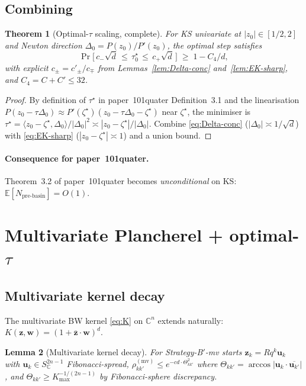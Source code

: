 \documentclass[11pt,a4paper]{article}
\newtheorem{theorem}{Theorem}[section]
\newtheorem{lemma}[theorem]{Lemma}
\begin{document}
\subsection{Combining}

\begin{theorem}[Optimal-$\tau$ scaling, complete]\label{thm:tau-complete}
For KS univariate at $|z_0| \in [1/2, 2]$ and Newton direction $\Delta_0 = P(z_0)/P'(z_0)$, the optimal step satisfies
\begin{equation}\label{eq:tau-final}
\Pr\bigl[\,c_- \sqrt d \,\le\, \tau^\star_0 \,\le\, c_+ \sqrt d\,\bigr] \;\ge\; 1 - C_4/d,
\end{equation}
with explicit $c_\pm = c'_\pm/c_\mp$ from Lemmas~\ref{lem:Delta-conc} and~\ref{lem:EK-sharp}, and $C_4 = C + C' \le 32$.
\end{theorem}

\begin{proof}
By definition of $\tau^\star$ in paper~101quater Definition~3.1 and the linearisation
$P(z_0 - \tau \Delta_0) \approx P'(\zeta^\star)(z_0 - \tau \Delta_0 - \zeta^\star)$ near $\zeta^\star$,
the minimiser is $\tau^\star = \langle z_0 - \zeta^\star, \Delta_0\rangle/|\Delta_0|^2 \asymp |z_0 - \zeta^\star|/|\Delta_0|$. Combine \eqref{eq:Delta-conc} ($|\Delta_0| \asymp 1/\sqrt d$) with \eqref{eq:EK-sharp} ($|z_0 - \zeta^\star| \asymp 1$) and a union bound.
\end{proof}

\paragraph{Consequence for paper~101quater.}
Theorem~3.2 of paper~101quater becomes \emph{unconditional} on KS: $\mathbb E[N_{\text{pre-basin}}] = O(1)$.

\section{Multivariate Plancherel + optimal-$\tau$}\label{sec:mv-proofs}

\subsection{Multivariate kernel decay}

The multivariate BW kernel \eqref{eq:K} on $\mathbb C^n$ extends naturally:
$K(\mathbf z, \mathbf w) = (1 + \overline{\mathbf z}\cdot \mathbf w)^d$.

\begin{lemma}[Multivariate kernel decay]\label{lem:kernel-decay-mv}
For Strategy-B$'$-mv starts $\mathbf z_k = R q^k \mathbf u_k$ with $\mathbf u_k \in S^{2n-1}_{\mathbb C}$ Fibonacci-spread,
$\rho_{kk'}^{(\mathrm{mv})} \le e^{-c d \cdot \Theta_{kk'}^2}$
where $\Theta_{kk'} = \arccos|\mathbf u_k \cdot \overline{\mathbf u_{k'}}|$, and $\Theta_{kk'} \ge K_{\max}^{-1/(2n-1)}$ by Fibonacci-sphere discrepancy.
\end{lemma}
\end{document}
